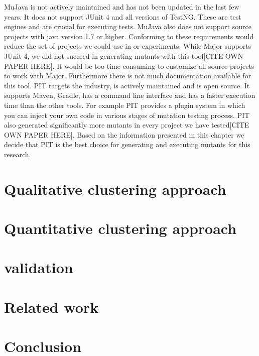 \documentclass[conference]{IEEEtran}
\begin{document}
MuJava is not actively maintained and has not been updated in the last few years.
It does not support JUnit 4 and all versions of TestNG\cite{mujava}.
These are test engines and are crucial for executing tests.
MuJava also does not support source projects with java version 1.7 or higher\cite{mujava}.
Conforming to these requirements would reduce the set of projects we could use in or experiments.
\newline
While Major supports JUnit 4,
we did not succeed in generating mutants with this tool[CITE OWN PAPER HERE].
It would be too time consuming to customize all source projects to work with Major.
Furthermore there is not much documentation available for this tool.
\newline
PIT targets the industry, is actively maintained and is open source\cite{Kintis2016AnalysingStudy}.
It supports Maven, Gradle, has a command line interface and has a faster execution time than the other tools.
For example PIT provides a plugin system in which you can inject your own code in various stages of mutation testing process\cite{pit}.
PIT also generated significantly more mutants in every project we have tested[CITE OWN PAPER HERE].
Based on the information presented in this chapter we decide that PIT is the best choice for generating and executing mutants for this research.


\section{Qualitative clustering approach}
\section{Quantitative clustering approach}
\section{validation}


\section{Related work}
\label{sec:rw}

\section{Conclusion}
\label{sec:conclusion}

\printbibliography[heading=bibintoc]
\end{document}
